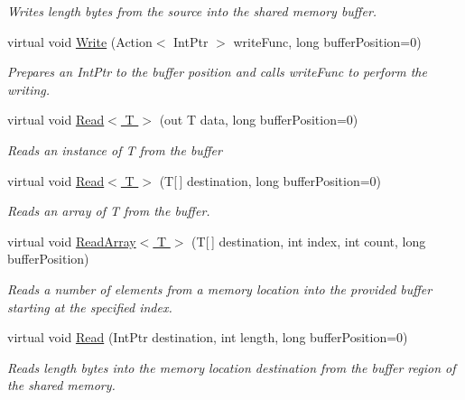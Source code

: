 \begin{DoxyCompactItemize}
\begin{DoxyCompactList}\small\item\em Writes {\itshape length}  bytes from the {\itshape source}  into the shared memory buffer. \end{DoxyCompactList}\item 
virtual void \hyperlink{class_shared_memory_1_1_shared_buffer_abc575d2ef1f8df8cc05fadb1b96b22e8}{Write} (Action$<$ Int\+Ptr $>$ write\+Func, long buffer\+Position=0)
\begin{DoxyCompactList}\small\item\em Prepares an Int\+Ptr to the buffer position and calls {\itshape write\+Func}  to perform the writing. \end{DoxyCompactList}\item 
virtual void \hyperlink{class_shared_memory_1_1_shared_buffer_a27d48f6be3b300882aa9aa71339421be}{Read$<$ T $>$} (out T data, long buffer\+Position=0)
\begin{DoxyCompactList}\small\item\em Reads an instance of {\itshape T}  from the buffer \end{DoxyCompactList}\item 
virtual void \hyperlink{class_shared_memory_1_1_shared_buffer_aba5489c699f444012792fd6331affb03}{Read$<$ T $>$} (T\mbox{[}$\,$\mbox{]} destination, long buffer\+Position=0)
\begin{DoxyCompactList}\small\item\em Reads an array of {\itshape T}  from the buffer. \end{DoxyCompactList}\item 
virtual void \hyperlink{class_shared_memory_1_1_shared_buffer_aca716450a74551277e53000d61a59fcd}{Read\+Array$<$ T $>$} (T\mbox{[}$\,$\mbox{]} destination, int index, int count, long buffer\+Position)
\begin{DoxyCompactList}\small\item\em Reads a number of elements from a memory location into the provided buffer starting at the specified index. \end{DoxyCompactList}\item 
virtual void \hyperlink{class_shared_memory_1_1_shared_buffer_a95407dfdc38af1afeeb9a9c4a8569982}{Read} (Int\+Ptr destination, int length, long buffer\+Position=0)
\begin{DoxyCompactList}\small\item\em Reads {\itshape length}  bytes into the memory location {\itshape destination}  from the buffer region of the shared memory. \end{DoxyCompactList}\item 

\end{DoxyCompactItemize}
